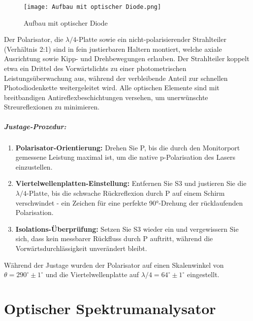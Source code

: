 \begin{figure}[htbp]
  \centering
  \texttt{[image: Aufbau mit optischer Diode.png]}
  \caption{Aufbau mit optischer Diode \cite{praktikum}}
  \label{fig:aufbau_mit_optischer_diode}
\end{figure}

Der Polarisator, die $\lambda/4$-Platte sowie ein nicht-polarisierender Strahlteiler (Verhältnis 2:1) sind in fein justierbaren Haltern montiert, welche axiale Ausrichtung sowie Kipp- und Drehbewegungen erlauben. 
Der Strahlteiler koppelt etwa ein Drittel des Vorwärtslichts zu einer photometrischen Leistungsüberwachung aus, während der verbleibende Anteil zur schnellen Photodiodenkette weitergeleitet wird. 
Alle optischen Elemente sind mit breitbandigen Antireflexbeschichtungen versehen, um unerwünschte Streureflexionen zu minimieren.

\paragraph{Justage-Prozedur:}
\begin{enumerate}
  \item \textbf{Polarisator-Orientierung:} Drehen Sie P, bis die durch den Monitorport gemessene Leistung maximal ist, um die native p-Polarisation des Lasers einzustellen.
  \item \textbf{Viertelwellenplatten-Einstellung:} Entfernen Sie S3 und justieren Sie die $\lambda/4$-Platte, bis die schwache Rückreflexion durch P auf einem Schirm verschwindet - ein Zeichen für eine perfekte 90°-Drehung der rücklaufenden Polarisation.
  \item \textbf{Isolations-Überprüfung:} Setzen Sie S3 wieder ein und vergewissern Sie sich, dass kein messbarer Rückfluss durch P auftritt, während die Vorwärtsdurchlässigkeit unverändert bleibt.  
\end{enumerate}

Während der Justage wurden der Polarisator auf einen Skalenwinkel von $\theta = 290^\circ \pm 1^\circ$ und die Viertelwellenplatte auf $\lambda/4 = 64^\circ \pm 1^\circ$ eingestellt.


\chapter{Optischer Spektrumanalysator} \label{sec:5.7}

